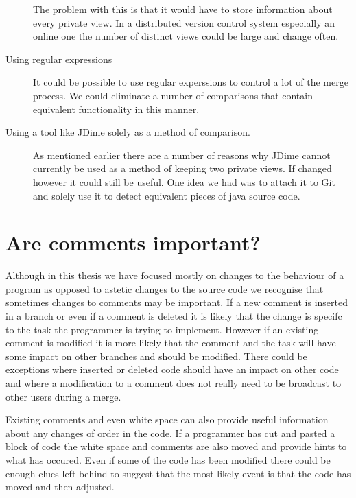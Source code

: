 \begin{description}
    The problem with this is that it would have to store information about every private view.  In a distributed version control system especially an online one the number of distinct views could be large and change often.   
  \item [Using regular expressions]
   It could be possible to use regular experssions to control a lot of the merge process.  We could eliminate a number of comparisons that contain equivalent functionality in this manner.
  \item [Using a tool like JDime solely as a method of comparison.]
    As mentioned earlier there are a number of reasons why JDime cannot currently be used as a method of keeping two private views. If changed however it could still be useful.  One idea we had was to attach it to Git and solely use it to detect equivalent pieces of java source code.
\end{description}

\section{Are comments important?}
Although in this thesis we have focused mostly on changes to the behaviour of a program as opposed to astetic changes to the source code we recognise that sometimes changes to comments may be important.  If a new comment is inserted in a branch or even if a comment is deleted it is likely that the change is specifc to the task the programmer is trying to implement.  However if an existing comment is modified it is more likely that the comment and the task will have some impact on other branches and should be modified.  There could be exceptions where inserted or deleted code should have an impact on other code and where a modification to a comment does not really need to be broadcast to other users during a merge.

Existing comments and even white space can also provide useful information about any changes of order in the code.  If a programmer has cut and pasted a block of code the white space and comments are also moved and provide hints to what has occured.  Even if some of the code has been modified there could be enough clues left behind to suggest that the most likely event is that the code has moved and then adjusted.

